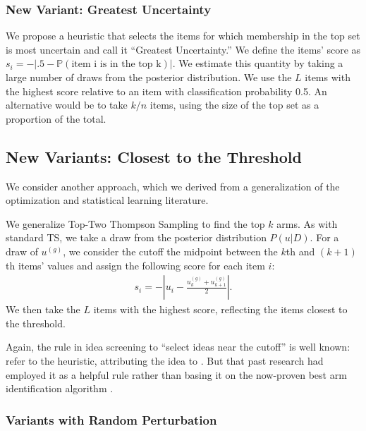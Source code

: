 \documentclass[nonblindrev]{informs3}
\newcommand{\numitems}{n}
\newcommand{\numtopset}{k}
\newcommand{\numperset}{L}
\begin{document}
\subsubsection{New Variant: Greatest Uncertainty}

We propose a heuristic that selects the items for which membership in the top set is most uncertain and call it ``Greatest Uncertainty.''  We define the items' score as $s_i=-|.5-\mathbb{P} (\text{item i is in the top k})|$. We estimate this quantity by taking a large number of draws from the posterior distribution. We use the $\numperset$ items with the highest score relative to an item with classification probability 0.5. An alternative would be to take $\numtopset/\numitems$ items, using the size of the top set as a proportion of the total. 

\subsection{New Variants: Closest to the Threshold}

We consider another approach, which we derived from a generalization of the optimization and statistical learning literature. 

We generalize Top-Two Thompson Sampling to find the top $k$ arms. As with standard TS, we take a draw from the posterior distribution $P(u|D)$. For a draw of $u^{(g)}$, we consider the cutoff the midpoint between the $k$th and $(k+1)$th items' values and assign the following score for each item $i$:
\begin{align}
s_i= - | u_i - \frac{u_k^{(g)} +u_{k+1}^{(g)} }{2}|.
\end{align} 
We then take the $\numperset$ items with the highest score, reflecting the items closest to the threshold. 

Again, the rule in idea screening to ``select ideas near the cutoff'' is well known: \cite{toubia2007adaptive} refer to the heuristic, attributing the idea to \cite{bradlow1998some}. But that past research had employed it as a helpful rule rather than basing it on the now-proven best arm identification algorithm \citep{russo2018simple}. 

\subsubsection{Variants with Random Perturbation}
\end{document}
